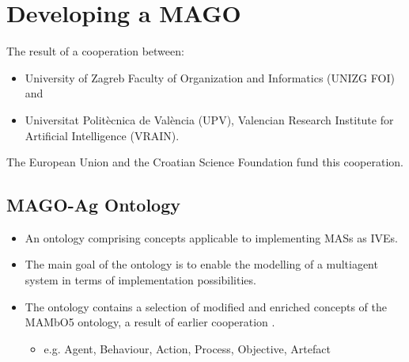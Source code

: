 \section[MAGO]{Developing a \ac{MAGO}}

\begin{frame}{\insertsection}
    The result of a cooperation between:
        \begin{itemize}
            \item University of Zagreb Faculty of Organization and Informatics (\alert{UNIZG FOI}) and
            \item Universitat Politècnica de València (\alert{UPV}), Valencian Research Institute for Artificial Intelligence (\alert{VRAIN}).
        \end{itemize}

    \medskip
    The European Union and the Croatian Science Foundation fund this cooperation.
\end{frame}

\begin{frame}{\insertsection}
\end{frame}



\subsection{MAGO-Ag Ontology}

\begin{frame}{\insertsubsection}
    \begin{itemize}
        \item An ontology comprising concepts applicable to \alert{implementing \acp{MAS} as \acp{IVE}}.

        \item The \alert{main goal} of the ontology is to enable the modelling of a multiagent system in terms of implementation possibilities.

        \item The ontology contains a selection of modified and enriched concepts of the MAMbO5 ontology, a result of earlier cooperation \cite{okresaduric2019MAMbO5NewOntology}.

        \begin{itemize}
            \item e.g. Agent, Behaviour, Action, Process, Objective, Artefact
        \end{itemize}
    \end{itemize}
\end{frame}

